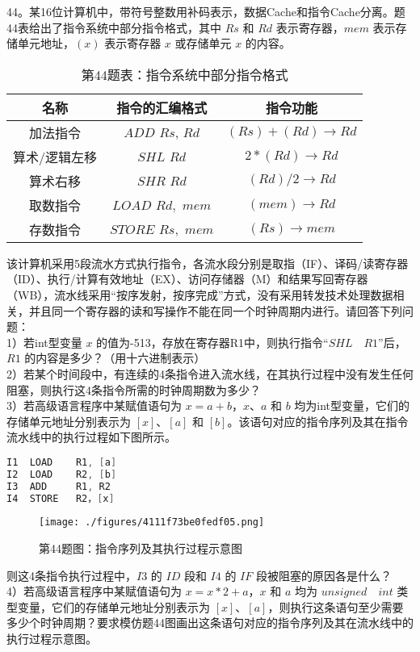 44。某16位计算机中，带符号整数用补码表示，数据Cache和指令Cache分离。题44表给出了指令系统中部分指令格式，其中 $Rs$ 和 $Rd$ 表示寄存器，$mem$ 表示存储单元地址，$(x)$ 表示寄存器 $x$ 或存储单元 $x$ 的内容。\\
\begin{table}[ht]
\centering
\caption{第44题表：指令系统中部分指令格式}\label{tab_CSN12_2}
\begin{tabular}{|c|c|c|}
\hline
名称 & 指令的汇编格式 & 指令功能 \\
\hline
加法指令 & $ADD$ $Rs$, $Rd$ & $(Rs)+(Rd) \rightarrow Rd$ \\
\hline
算术/逻辑左移 & $SHL$ $Rd$ & $2*(Rd) \rightarrow Rd$ \\
\hline
算术右移 & $SHR$ $Rd$ & $(Rd)/2 \rightarrow Rd$ \\
\hline
取数指令& $LOAD$ $Rd,$ $mem$ & $(mem) \rightarrow Rd$ \\
\hline
存数指令 & $STORE$ $Rs,$ $mem$ & $(Rs) \rightarrow mem$ \\
\hline
\end{tabular}
\end{table}
该计算机采用5段流水方式执行指令，各流水段分别是取指（IF）、译码/读寄存器（ID）、执行/计算有效地址（EX）、访问存储器（M）和结果写回寄存器（WB），流水线采用“按序发射，按序完成”方式，没有采用转发技术处理数据相关，并且同一个寄存器的读和写操作不能在同一个时钟周期内进行。请回答下列问题：\\
1）若int型变量 $x$ 的值为-513，存放在寄存器R1中，则执行指令“$SHL \quad R1$”后，$R1$ 的内容是多少？（用十六进制表示）\\
2）若某个时间段中，有连续的4条指令进入流水线，在其执行过程中没有发生任何阻塞，则执行这4条指令所需的时钟周期数为多少？\\
3）若高级语言程序中某赋值语句为 $x=a+b$，$x$、$a$ 和 $b$ 均为int型变量，它们的存储单元地址分别表示为 $[x]$、$[a]$ 和 $[b]$。该语句对应的指令序列及其在指令流水线中的执行过程如下图所示。\\
\begin{lstlisting}[language=cpp]
I1  LOAD    R1, [a]
I2  LOAD    R2, [b]
I3  ADD     R1, R2
I4  STORE   R2，[x]
\end{lstlisting}
\begin{figure}[ht]
\centering
\texttt{[image: ./figures/4111f73be0fedf05.png]}
\caption{第44题图：指令序列及其执行过程示意图} \label{fig_CSN12_5}
\end{figure}
则这4条指令执行过程中，$I3$ 的 $ID$ 段和 $I4$ 的 $IF$ 段被阻塞的原因各是什么？\\
4）若高级语言程序中某赋值语句为 $x=x*2+a$，$x$ 和 $a$ 均为 $unsigned \quad int$ 类型变量，它们的存储单元地址分别表示为 $[x]$、$[a]$，则执行这条语句至少需要多少个时钟周期？要求模仿题44图画出这条语句对应的指令序列及其在流水线中的执行过程示意图。

